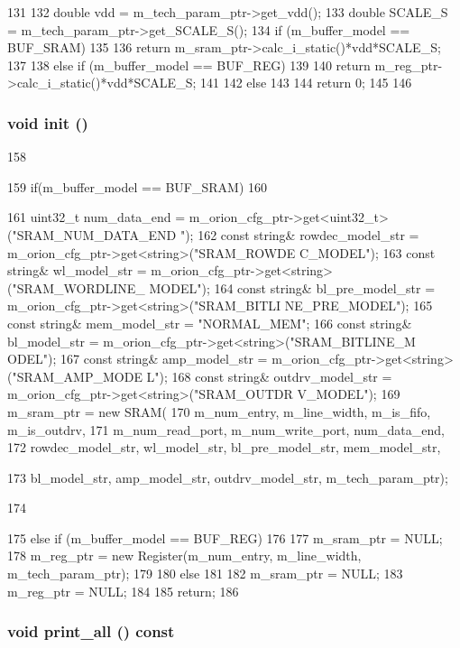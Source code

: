 \begin{DoxyCode}
131 {
132     double vdd = m_tech_param_ptr->get_vdd();
133     double SCALE_S = m_tech_param_ptr->get_SCALE_S();
134     if (m_buffer_model == BUF_SRAM)
135     {
136         return m_sram_ptr->calc_i_static()*vdd*SCALE_S;
137     }
138     else if (m_buffer_model == BUF_REG)
139     {
140         return m_reg_ptr->calc_i_static()*vdd*SCALE_S;
141     }
142     else
143     {
144         return 0;
145     }
146 }
\end{DoxyCode}
\hypertarget{classBuffer_a02fd73d861ef2e4aabb38c0c9ff82947}{
\subsubsection[{init}]{\setlength{\rightskip}{0pt plus 5cm}void init ()}}
\label{classBuffer_a02fd73d861ef2e4aabb38c0c9ff82947}



\begin{DoxyCode}
158 {
159     if(m_buffer_model == BUF_SRAM)
160     {
161         uint32_t num_data_end = m_orion_cfg_ptr->get<uint32_t>("SRAM_NUM_DATA_END
      ");
162         const string& rowdec_model_str = m_orion_cfg_ptr->get<string>("SRAM_ROWDE
      C_MODEL");
163         const string& wl_model_str = m_orion_cfg_ptr->get<string>("SRAM_WORDLINE_
      MODEL");
164         const string& bl_pre_model_str = m_orion_cfg_ptr->get<string>("SRAM_BITLI
      NE_PRE_MODEL");
165         const string& mem_model_str = "NORMAL_MEM";
166         const string& bl_model_str = m_orion_cfg_ptr->get<string>("SRAM_BITLINE_M
      ODEL");
167         const string& amp_model_str = m_orion_cfg_ptr->get<string>("SRAM_AMP_MODE
      L");
168         const string& outdrv_model_str = m_orion_cfg_ptr->get<string>("SRAM_OUTDR
      V_MODEL");
169         m_sram_ptr = new SRAM(
170                 m_num_entry, m_line_width, m_is_fifo, m_is_outdrv, 
171                 m_num_read_port, m_num_write_port, num_data_end, 
172                 rowdec_model_str, wl_model_str, bl_pre_model_str, mem_model_str, 
      
173                 bl_model_str, amp_model_str, outdrv_model_str, m_tech_param_ptr);
      
174     }
175     else if (m_buffer_model == BUF_REG)
176     {
177         m_sram_ptr = NULL;
178         m_reg_ptr = new Register(m_num_entry, m_line_width, m_tech_param_ptr);
179     }
180     else
181     {
182         m_sram_ptr = NULL;
183         m_reg_ptr = NULL;
184     }
185     return;
186 }
\end{DoxyCode}
\hypertarget{classBuffer_a8404831790e4809674f0249ef6505cd5}{
\subsubsection[{print\_\-all}]{\setlength{\rightskip}{0pt plus 5cm}void print\_\-all () const}}
\label{classBuffer_a8404831790e4809674f0249ef6505cd5}




